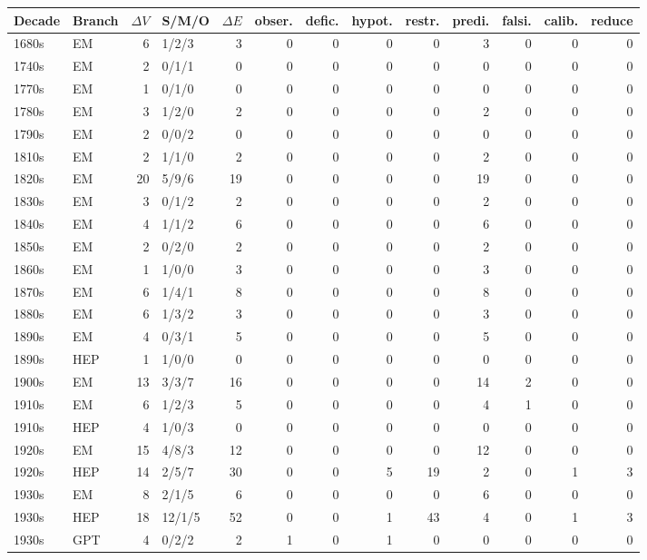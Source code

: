 \begin{longtable}{@{}llrlrrrrrrrrr@{}}\toprule
Decade & Branch & $\Delta V$ & S/M/O & $\Delta E$ & obser. & defic. & hypot. & restr. & predi. & falsi. & calib. & reduce \\\midrule\endhead
1680s & EM & 6 & 1/2/3 & 3 & 0 & 0 & 0 & 0 & 3 & 0 & 0 & 0 \\
1740s & EM & 2 & 0/1/1 & 0 & 0 & 0 & 0 & 0 & 0 & 0 & 0 & 0 \\
1770s & EM & 1 & 0/1/0 & 0 & 0 & 0 & 0 & 0 & 0 & 0 & 0 & 0 \\
1780s & EM & 3 & 1/2/0 & 2 & 0 & 0 & 0 & 0 & 2 & 0 & 0 & 0 \\
1790s & EM & 2 & 0/0/2 & 0 & 0 & 0 & 0 & 0 & 0 & 0 & 0 & 0 \\
1810s & EM & 2 & 1/1/0 & 2 & 0 & 0 & 0 & 0 & 2 & 0 & 0 & 0 \\
1820s & EM & 20 & 5/9/6 & 19 & 0 & 0 & 0 & 0 & 19 & 0 & 0 & 0 \\
1830s & EM & 3 & 0/1/2 & 2 & 0 & 0 & 0 & 0 & 2 & 0 & 0 & 0 \\
1840s & EM & 4 & 1/1/2 & 6 & 0 & 0 & 0 & 0 & 6 & 0 & 0 & 0 \\
1850s & EM & 2 & 0/2/0 & 2 & 0 & 0 & 0 & 0 & 2 & 0 & 0 & 0 \\
1860s & EM & 1 & 1/0/0 & 3 & 0 & 0 & 0 & 0 & 3 & 0 & 0 & 0 \\
1870s & EM & 6 & 1/4/1 & 8 & 0 & 0 & 0 & 0 & 8 & 0 & 0 & 0 \\
1880s & EM & 6 & 1/3/2 & 3 & 0 & 0 & 0 & 0 & 3 & 0 & 0 & 0 \\
1890s & EM & 4 & 0/3/1 & 5 & 0 & 0 & 0 & 0 & 5 & 0 & 0 & 0 \\
1890s & HEP & 1 & 1/0/0 & 0 & 0 & 0 & 0 & 0 & 0 & 0 & 0 & 0 \\
1900s & EM & 13 & 3/3/7 & 16 & 0 & 0 & 0 & 0 & 14 & 2 & 0 & 0 \\
1910s & EM & 6 & 1/2/3 & 5 & 0 & 0 & 0 & 0 & 4 & 1 & 0 & 0 \\
1910s & HEP & 4 & 1/0/3 & 0 & 0 & 0 & 0 & 0 & 0 & 0 & 0 & 0 \\
1920s & EM & 15 & 4/8/3 & 12 & 0 & 0 & 0 & 0 & 12 & 0 & 0 & 0 \\
1920s & HEP & 14 & 2/5/7 & 30 & 0 & 0 & 5 & 19 & 2 & 0 & 1 & 3 \\
1930s & EM & 8 & 2/1/5 & 6 & 0 & 0 & 0 & 0 & 6 & 0 & 0 & 0 \\
1930s & HEP & 18 & 12/1/5 & 52 & 0 & 0 & 1 & 43 & 4 & 0 & 1 & 3 \\
1930s & GPT & 4 & 0/2/2 & 2 & 1 & 0 & 1 & 0 & 0 & 0 & 0 & 0 \\

\end{longtable}
